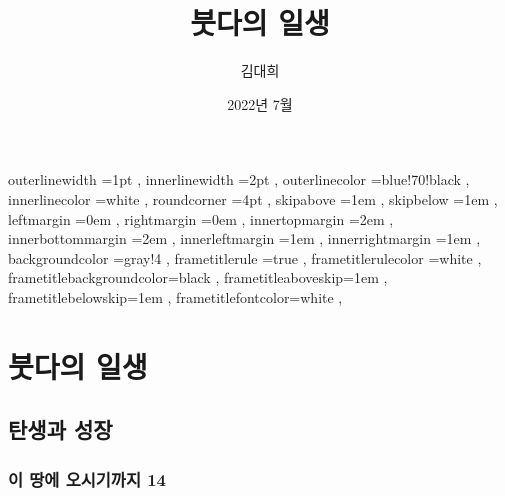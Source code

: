 \documentclass[12pt, a4paper, oneside]{book}
\let\stdsection\section
\renewcommand\section{\newpage\stdsection}
\begin{document}
	
			\dominitoc
			\doparttoc			



			\title{붓다의 일생}
			\author{김대희}
			\date{2022년 7월}
			\maketitle


			\tableofcontents 		%
			\cleardoublepage
			\listoftables 			%





		 {
						outerlinewidth		=1pt			,%
						innerlinewidth		=2pt			,%
						outerlinecolor		=blue!70!black	,%
						innerlinecolor		=white 			,%
						roundcorner			=4pt			,%
						skipabove			=1em 			,%
						skipbelow			=1em 			,%
						leftmargin			=0em			,%
						rightmargin			=0em			,%
						innertopmargin		=2em 			,%
						innerbottommargin 	=2em 			,%
						innerleftmargin		=1em 			,%
						innerrightmargin		=1em 			,%
						backgroundcolor		=gray!4			,%
						frametitlerule		=true 			,%
						frametitlerulecolor	=white			,%
						frametitlebackgroundcolor=black		,%
						frametitleaboveskip=1em 			,%
						frametitlebelowskip=1em 			,%
						frametitlefontcolor=white 			,%
						}



	\part{붓다의 일생}
	\noptcrule
	\parttoc				

%
%
%
\chapter{탄생과 성장}


%
	\section{이 땅에 오시기까지 14 }
\end{document}
